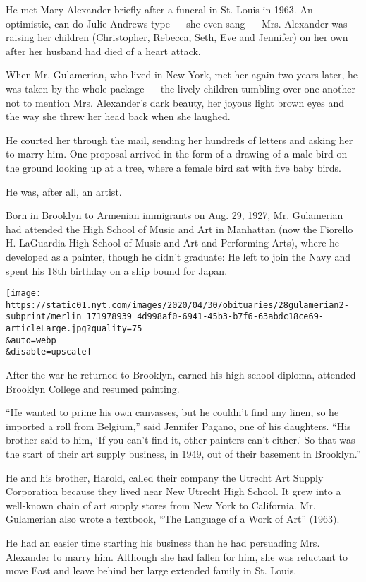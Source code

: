 He met Mary Alexander briefly after a funeral in St. Louis in 1963. An
optimistic, can-do Julie Andrews type --- she even sang --- Mrs.
Alexander was raising her children (Christopher, Rebecca, Seth, Eve and
Jennifer) on her own after her husband had died of a heart attack.

When Mr. Gulamerian, who lived in New York, met her again two years
later, he was taken by the whole package --- the lively children
tumbling over one another not to mention Mrs. Alexander's dark beauty,
her joyous light brown eyes and the way she threw her head back when she
laughed.

He courted her through the mail, sending her hundreds of letters and
asking her to marry him. One proposal arrived in the form of a drawing
of a male bird on the ground looking up at a tree, where a female bird
sat with five baby birds.

He was, after all, an artist.

Born in Brooklyn to Armenian immigrants on Aug. 29, 1927, Mr. Gulamerian
had attended the High School of Music and Art in Manhattan (now the
Fiorello H. LaGuardia High School of Music and Art and Performing Arts),
where he developed as a painter, though he didn't graduate: He left to
join the Navy and spent his 18th birthday on a ship bound for Japan.

\texttt{[image: https://static01.nyt.com/images/2020/04/30/obituaries/28gulamerian2-subprint/merlin\_171978939\_4d998af0-6941-45b3-b7f6-63abdc18ce69-articleLarge.jpg?quality=75\\\&auto=webp\\\&disable=upscale]}

After the war he returned to Brooklyn, earned his high school diploma,
attended Brooklyn College and resumed painting.

``He wanted to prime his own canvasses, but he couldn't find any linen,
so he imported a roll from Belgium,'' said Jennifer Pagano, one of his
daughters. ``His brother said to him, `If you can't find it, other
painters can't either.' So that was the start of their art supply
business, in 1949, out of their basement in Brooklyn.''

He and his brother, Harold, called their company the Utrecht Art Supply
Corporation because they lived near New Utrecht High School. It grew
into a well-known chain of art supply stores from New York to
California. Mr. Gulamerian also wrote a textbook, ``The Language of a
Work of Art'' (1963).

He had an easier time starting his business than he had persuading Mrs.
Alexander to marry him. Although she had fallen for him, she was
reluctant to move East and leave behind her large extended family in St.
Louis.

